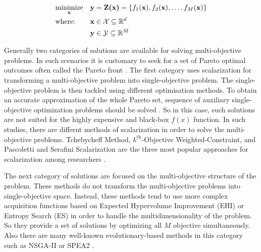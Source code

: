 \begin{equation*}
\begin{aligned}
& \underset{\textbf{x}}{\text{minimize}}
& & \textbf{y}=\textbf{Z(x)}=\{f_1(\textbf{x}),f_2(\textbf{x}), \ldots,f_M(\textbf{x})\} \\
& \text{where:}
& & {\textbf x} \in \mathcal{X} \subseteq \mathbb{R}^d\\
& \text{}
& & {\textbf y} \in \mathcal{Y} \subseteq \mathbb{R}^M\\
\end{aligned}
\end{equation*}
\par
Generally two categories of solutions are available for solving multi-objective problems. In such scenarios it is customary to seek for a set of Pareto optimal outcomes often called the Pareto front \cite{couckuyt2014fast}. The first category uses scalarization for transforming a multi-objective problem into single-objective problem. The single-objective problem is then tackled using different optimisation methods.
To obtain an accurate approximation of the whole Pareto set, sequence of auxiliary single-objective optimization problems should be solved \cite{tan2002evolutionary}. So in this case, such solutions are not suited for the highly expensive and black-box $f(x)$ function. In such studies, there are differnt methods of scalarization in order to solve the multi-objective problems. Tchebycheff Method, $k^{\text{th}}$-Objective Weighted-Constraint, and  Pascoletti and Serafini Scalarization are the three most popular approaches for scalarization among researchers \cite{pardalos2017non}.
\par
The next category of solutions are focused on the multi-objective structure of the problem. These methods do not transform the multi-objective problems into single-objective space. Instead, these methods tend to use more complex acquisition functions based on Expected Hypervolume Improvement (EHI) or Entropy Search (ES) in order to handle the multidimensionality of the problem. So they provide a set of solutions by optimizing all $M$ objective simultaneously. Also there are many well-known evolutionary-based methods in this category such as NSGA-II \cite{deb2002fast} or SPEA2 \cite{zitzler2001spea2}.

